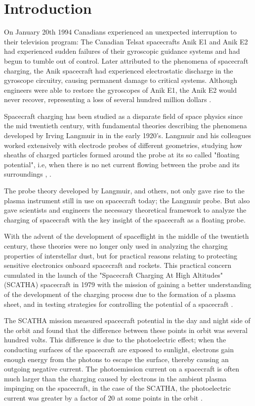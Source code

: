 \chapter{Introduction}
\label{sec:intro}

On January 20th 1994 Canadians experienced an unexpected interruption to their television program: The Canadian Telsat spacecrafts Anik E1 and Anik E2 had experienced sudden failures of their gyroscopic guidance systems and had begun to tumble out of control. Later attributed to the phenomena of spacecraft charging, the Anik spacecraft had experienced electrostatic discharge in the gyroscope circuitry, causing permanent damage to critical systems. Although engineers were able to restore the gyroscopes of Anik E1, the Anik E2 would never recover, representing a loss of several hundred million dollars \parencite{Leach1995}.

Spacecraft charging has been studied as a disparate field of space physics since the mid twentieth century, with fundamental theories describing the phenomena developed by Irving Langmuir in in the early 1920's. Langmuir and his colleagues worked extensively with electrode probes of different geometries, studying how sheaths of charged particles formed around the probe at its so called "floating potential", i.e, when there is no net current flowing between the probe and its surroundings \parencite{Mott-Smith1926}, \parencite{Garrett1981}. 

The probe theory developed by Langmuir, and others, not only gave rise to the plasma instrument still in use on spacecraft today; the Langmuir probe. But also gave scientists and engineers the necessary theoretical framework to analyze the charging of spacecraft with the key insight of the spacecraft as a floating probe. 

With the advent of the development of spaceflight in the middle of the twentieth century, these theories were no longer only used in analyzing the charging properties of interstellar dust, but for practical reasons relating to protecting sensitive electronics onboard spacecraft and rockets. This practical concern cumulated in the launch of the "Spacecraft Charging At High Altitudes" (SCATHA) spacecraft in 1979 with the mission of gaining a better understanding of the development of the charging process due to the formation of a plasma sheet, and in testing strategies for controlling the potential of a spacecraft \parencite{SCATHA2020}. 

The SCATHA mission measured spacecraft potential in the day and night side of the orbit
and found that the difference between these points in orbit was several hundred volts\parencite{Mullen1986}. This difference is due to the photoelectric effect; when the conducting surfaces of the spacecraft are exposed to sunlight, electrons gain enough energy from the photons to escape the surface, thereby causing an outgoing negative current. The photoemission current on a spacecraft is often much larger than the charging caused by electrons in the ambient plasma impinging on the spacecraft, in the case of the SCATHA, the photoelectric current was greater by a factor of 20 at some points in the orbit \parencite{LAI2019}.  

